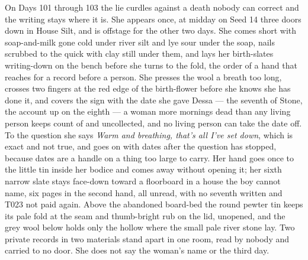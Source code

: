 \documentclass{design/chronicle}
\begin{document}
{On Days 101 through 103 the lie curdles against a death nobody can correct and the writing stays where it is. She appears once, at midday on Seed 14 three doors down in House Silt, and is offstage for the other two days. She comes short with soap-and-milk gone cold under river silt and lye sour under the soap, nails scrubbed to the quick with clay still under them, and lays her birth-slates writing-down on the bench before she turns to the fold, the order of a hand that reaches for a record before a person. She presses the wool a breath too long, crosses two fingers at the red edge of the birth-flower before she knows she has done it, and covers the sign with the date she gave Dessa — the seventh of Stone, the account up on the eighth — a woman more mornings dead than any living person keeps count of and uncollected, and no living person can take the date off. To the question she says \emph{Warm and breathing, that’s all I’ve set down}, which is exact and not true, and goes on with dates after the question has stopped, because dates are a handle on a thing too large to carry. Her hand goes once to the little tin inside her bodice and comes away without opening it; her sixth narrow slate stays face-down toward a floorboard in a house the boy cannot name, six pages in the second hand, all unread, with no seventh written and T023 not paid again. Above the abandoned board-bed the round pewter tin keeps its pale fold at the seam and thumb-bright rub on the lid, unopened, and the grey wool below holds only the hollow where the small pale river stone lay. Two private records in two materials stand apart in one room, read by nobody and carried to no door. She does not say the woman’s name or the third day.

}
\end{document}
